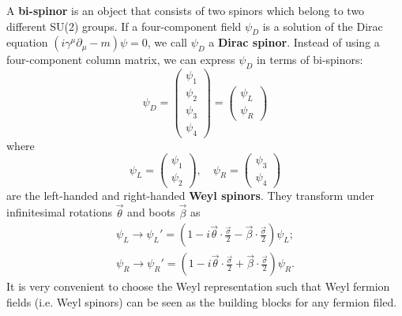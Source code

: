 \documentclass[12pt]{report}
\begin{document}
A \textbf{bi-spinor} is an object that consists of two spinors which belong to two different SU(2) groups.
If a four-component field $\psi_{D}$ is a solution of the Dirac equation $(i \gamma^{\mu} \partial_{\mu} - m) \psi  = 0$, we call $\psi_{D}$ a \textbf{Dirac spinor}. %
Instead of using a four-component column matrix, we can express $\psi_{D}$ in terms of bi-spinors:
\begin{equation}
\psi_{D} = \left(\begin{array}{c} \psi_{1} \\ \psi_{2} \\ \psi_{3} \\ \psi_{4} \end{array}\right) = \left(\begin{array}{c} \psi_{L} \\ \psi_{R} \end{array}\right)
\end{equation}
where
\begin{equation}
\psi_{L} = \left(\begin{array}{c} \psi_{1} \\ \psi_{2} \end{array}\right), \quad 
\psi_{R} = \left(\begin{array}{c} \psi_{3} \\ \psi_{4} \end{array}\right)
\end{equation}
are the left-handed and right-handed \textbf{Weyl spinors}.
They transform under infinitesimal rotations $\vec{\theta}$ and boots $\vec{\beta}$ as
\begin{eqnarray}
\psi_{L} \to \psi_{L}' = (1 - i \vec{\theta} \cdot \frac{\vec{\sigma}}{2} - \vec{\beta} \cdot \frac{\vec{\sigma}}{2}) \psi_{L} ;\\
\psi_{R} \to \psi_{R}' = (1 - i \vec{\theta} \cdot \frac{\vec{\sigma}}{2} + \vec{\beta} \cdot \frac{\vec{\sigma}}{2}) \psi_{R} .
\end{eqnarray}
It is very convenient to choose the Weyl representation such that Weyl fermion fields (i.e. Weyl spinors) can be seen as the building blocks for any fermion filed.
\end{document}
